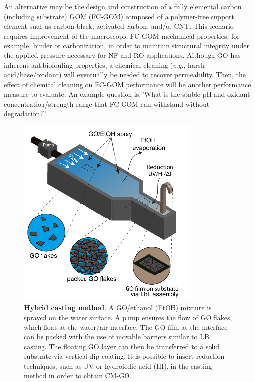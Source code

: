 An alternative may be the design and construction of a fully elemental carbon (including substrate) GOM (FC-GOM) composed of a polymer-free support element such as carbon black, activated carbon, and/or CNT. This scenario requires improvement of the macroscopic FC-GOM mechanical properties, for example, binder or carbonization, in order to maintain structural integrity under the applied pressure necessary for NF and RO applications. Although GO has inherent antibiofouling properties, a chemical cleaning (\textit{e.g.}, harsh acid/base/oxidant) will eventually be needed to recover permeability. Then, the effect of chemical cleaning on FC-GOM performance will be another performance measure to evaluate. An example question is,''What is the stable pH and oxidant concentration/strength range that FC-GOM can withstand without degradation?''



\begin{figure}[t!]
  \centering
  \includegraphics[width=3.5in]{paper2/Fig5.pdf}
  \caption{\textbf{Hybrid casting method}. A GO/ethanol (EtOH) mixture is sprayed on the water surface. A pump ensures the flow of GO flakes, which float at the water/air interface. The GO film at the interface can be packed with the use of movable barriers similar to LB casting. The floating GO layer can then be transferred to a solid substrate via vertical dip-coating. It is possible to insert reduction techniques, such as UV or hydroiodic acid (HI), in the casting method in order to obtain CM-GO.}
  \label{Fig5_pap2}
\end{figure}

